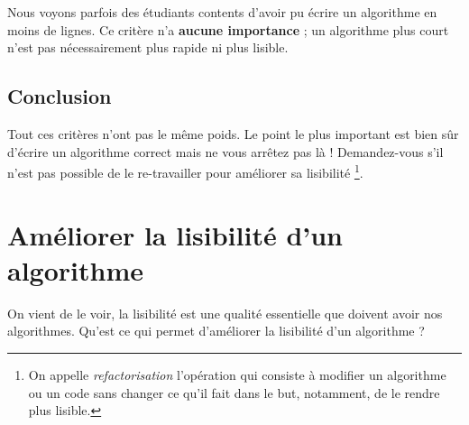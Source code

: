 			Nous voyons parfois des étudiants contents d'avoir
			pu écrire un algorithme en moins de lignes.
			Ce critère n'a \textbf{aucune importance} ;
			un algorithme plus court n'est pas nécessairement
			plus rapide ni plus lisible.
		
		\subsection{Conclusion}
			
			Tout ces critères n'ont pas le même poids.
			Le point le plus important est bien sûr d'écrire
			un algorithme correct mais ne vous arrêtez pas là !
			Demandez-vous s'il n'est pas possible de le re-travailler
			pour améliorer sa lisibilité%
			\footnote{%
				On appelle \emph{refactorisation}
				l'opération qui consiste à modifier
				un algorithme ou un code
				sans changer ce qu'il fait
				dans le but,
				notamment, de le rendre plus lisible.
			}.
		
	\section{Améliorer la lisibilité d'un algorithme}\label{lisibilite}
		
		On vient de le voir, la lisibilité est une qualité essentielle
		que doivent avoir nos algorithmes.
		Qu'est ce qui permet d'améliorer la lisibilité d'un algorithme ?
		
